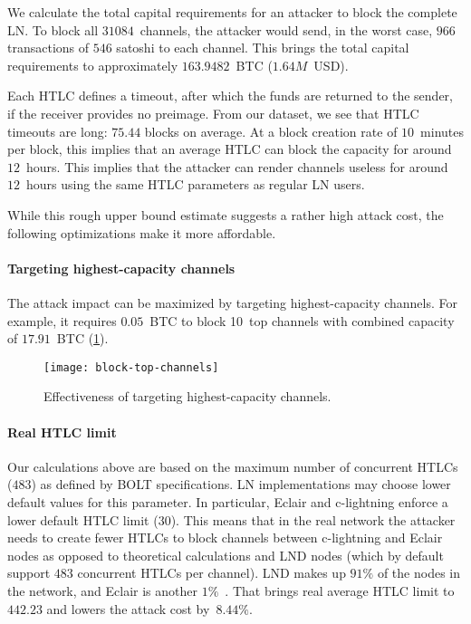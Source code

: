 We calculate the total capital requirements for an attacker to block the complete LN.
To block all $31084$~channels, the attacker would send, in the worst case, $966$ transactions of $546$ satoshi to each channel.
This brings the total capital requirements to approximately $163.9482$~BTC ($1.64M$~USD).

Each HTLC defines a timeout, after which the funds are returned to the sender, if the receiver provides no preimage.
From our dataset, we see that HTLC timeouts are long: $75.44$ blocks on average.
At a block creation rate of $10$~minutes per block, this implies that an average HTLC can block the capacity for around $12$~hours.
This implies that the attacker can render channels useless for around $12$~hours using the same HTLC parameters as regular LN users.

While this rough upper bound estimate suggests a rather high attack cost, the following optimizations make it more affordable.


\paragraph{Targeting highest-capacity channels}
The attack impact can be maximized by targeting highest-capacity channels.
For example, it requires $0.05$~BTC to block 10~top channels with combined capacity of $17.91$~BTC (\cref{fig:block-top-channels}).

\begin{figure}[tb]
	\centering
	\texttt{[image: block-top-channels]}
	\caption{Effectiveness of targeting highest-capacity channels.\label{fig:block-top-channels}}
\end{figure}

\paragraph{Real HTLC limit}
Our calculations above are based on the maximum number of concurrent HTLCs ($483$) as defined by BOLT specifications.
LN implementations may choose lower default values for this parameter.
In particular, Eclair and c-lightning enforce a lower default HTLC limit ($30$).
This means that in the real network the attacker needs to create fewer HTLCs to block channels between c-lightning and Eclair nodes as opposed to theoretical calculations and LND nodes (which by default support $483$ concurrent HTLCs per channel).
LND makes up $91\%$ of the nodes in the network, and Eclair is another $1\%$~\cite{Mizrahi2020}.
That brings real average HTLC limit to $442.23$ and lowers the attack cost by~$8.44\%$.

